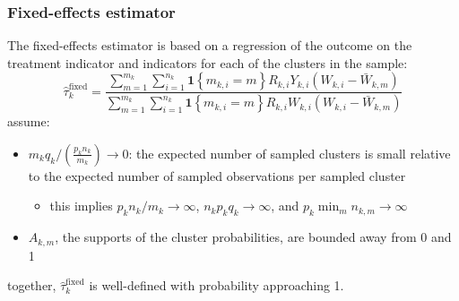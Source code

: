 \documentclass[twoside]{article}
\begin{document}
\subsubsection{Fixed-effects estimator}
The fixed-effects estimator is based on a regression of the outcome on the treatment indicator and indicators for each of the clusters in the sample:
\begin{equation*}
    \hat{\tau}^{\text{fixed}}_k = \frac{\sum^{m_k}_{m=1}\sum^{n_k}_{i=1}\mathbf{1}\left\{m_{k,i}=m\right\}R_{k,i}Y_{k,i}\left(W_{k,i}-\bar{W}_{k,m}\right) }{ \sum^{m_k}_{m=1}\sum^{n_k}_{i=1}\mathbf{1}\left\{m_{k,i}=m\right\}R_{k,i}W_{k,i}\left(W_{k,i}-\bar{W}_{k,m}\right) }
\end{equation*}
assume:
\begin{itemize}
    \item $m_kq_k/\left(\frac{p_kn_k}{m_k}\right) \rightarrow 0$: the expected number of sampled clusters is small relative to the expected number of sampled observations per sampled cluster
    \begin{itemize}
        \item this implies $p_kn_k/m_k\rightarrow\infty$, $n_kp_kq_k\rightarrow \infty$, and $p_k\min_mn_{k,m}\rightarrow\infty$
    \end{itemize}
    \item $A_{k,m}$, the supports of the cluster probabilities, are bounded away from 0 and 1
\end{itemize}
together, $\hat{\tau}^{\text{fixed}}_k$ is well-defined with probability approaching 1.
\end{document}
